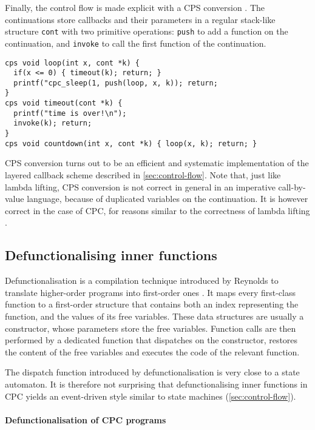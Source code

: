 \documentclass[a4paper]{llncs}
\begin{document}
Finally, the control flow is made explicit with a CPS conversion
\cite{DBLP:journals/tcs/Plotkin75,DBLP:journals/lisp/Reynolds93}.  The
continuations store callbacks and their parameters in a regular stack-like
structure \texttt{cont} with two primitive operations: \texttt{push} to add a
function on the continuation, and \texttt{invoke} to call the first function of
the continuation.
\begin{lstlisting}
cps void loop(int x, cont *k) {
  if(x <= 0) { timeout(k); return; }
  printf("cpc_sleep(1, push(loop, x, k)); return;
}
cps void timeout(cont *k) {
  printf("time is over!\n");
  invoke(k); return;
}
cps void countdown(int x, cont *k) { loop(x, k); return; }
\end{lstlisting}
CPS conversion turns out to be an efficient and systematic implementation of the
layered callback scheme described in \cref{sec:control-flow}.
Note that, just like lambda lifting, CPS conversion is not correct in general in
an imperative call-by-value language, because of duplicated variables on the
continuation.  It is however correct in the case of CPC, for reasons similar to
the correctness of lambda lifting \cite{kerneis2011}.

\subsection{Defunctionalising inner functions}
\label{sec:defun}

Defunctionalisation is a compilation technique introduced by Reynolds to
translate higher-order programs into first-order ones \cite{reynolds72}.  It
maps every first-class function to a first-order structure that contains
both an index representing the function, and the values of its free variables.
These data structures are usually a constructor, whose parameters store the free
variables.  Function calls are then performed by a dedicated function that
dispatches on the constructor, restores the content of the free variables and
executes the code of the relevant function.

The dispatch function introduced by defunctionalisation is very close to a state
automaton. It is therefore not surprising that defunctionalising inner functions
in CPC yields an event-driven style similar to state machines
(\cref{sec:control-flow}).

\paragraph{Defunctionalisation of CPC programs}
\end{document}
